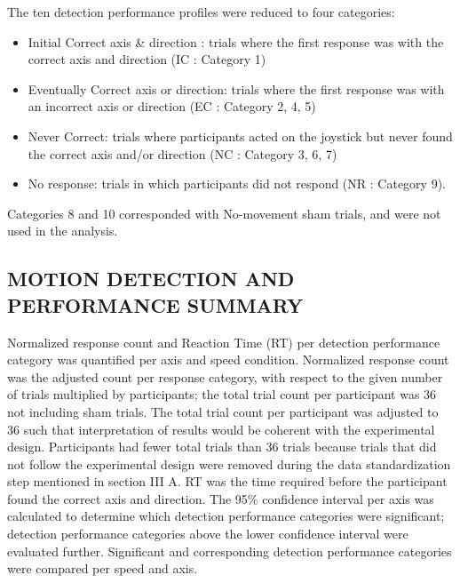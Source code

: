 \documentclass[11pt, onecolumn]{article}
\begin{document}
The ten detection performance profiles were reduced to four categories: 
\begin{itemize}
\item Initial Correct axis \& direction : trials where the first response was with the correct axis and direction (IC : Category 1)
\item Eventually Correct axis or direction: trials where the first response was with an incorrect axis or direction  (EC : Category 2, 4, 5)
\item Never Correct: trials where participants acted on the joystick but never found the correct axis and/or direction (NC : Category 3, 6, 7)
\item No response: trials in which participants did not respond (NR : Category 9).
\end{itemize}
Categories 8 and 10 corresponded with No-movement sham trials, and were not used in the analysis.

\subsection{MOTION DETECTION AND PERFORMANCE SUMMARY}
Normalized response count and Reaction Time (RT) per detection performance category was quantified per axis and speed condition.  Normalized response count was the  adjusted count per response category, with respect to the given number of trials multiplied by participants; the total trial count per participant was 36 not including sham trials.  The total trial count per participant was adjusted to 36 such that interpretation of results would be coherent with the experimental design.  Participants had fewer total trials than 36 trials because trials that did not follow the experimental design were removed during the data standardization step mentioned in section III A.  RT was the time required before the participant found the correct axis and direction.  The 95\% confidence interval per axis was calculated to determine which detection performance categories were significant; detection performance categories above the lower confidence interval were evaluated further.  Significant and corresponding detection performance categories were compared per speed and axis.  
\end{document}
